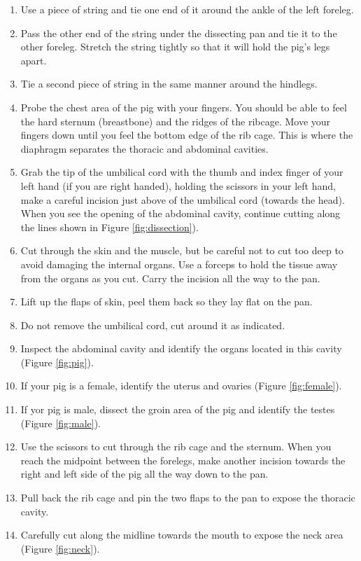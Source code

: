 \begin{enumerate}
\item
  Use a piece of string and tie one end of it around the ankle of the left foreleg.
\item
  Pass the other end of the string under the dissecting pan and tie it to the other foreleg. Stretch the string tightly so that it will hold the pig's legs apart.
\item
  Tie a second piece of string in the same manner around the hindlegs.
\item
  Probe the chest area of the pig with your fingers. You should be able to feel the hard sternum (breastbone) and the ridges of the ribcage. Move your fingers down until you feel the bottom edge of the rib cage. This is where the diaphragm separates the thoracic and abdominal cavities.
\item
        Grab the tip of the umbilical cord with the thumb and index finger of your left hand (if you are right handed), holding the scissors in your left hand, make a careful incision just above of the umbilical cord (towards the head). When you see the opening of the abdominal cavity, continue cutting along the lines shown in Figure \ref{fig:dissection}).
\item
  Cut through the skin and the muscle, but be careful not to cut too deep to avoid damaging the internal organs. Use a forceps to hold the tissue away from the organs as you cut. Carry the incision all the way to the pan.
\item
  Lift up the flaps of skin, peel them back so they lay flat on the pan.
\item
  Do not remove the umbilical cord, cut around it as indicated.
\item
  Inspect the abdominal cavity and identify the organs located in this cavity (Figure \ref{fig:pig}).
\item
  If your pig is a female, identify the uterus and ovaries (Figure \ref{fig:female}).
\item
  If yor pig is male, dissect the groin area of the pig and identify the testes (Figure \ref{fig:male}).
\item
  Use the scissors to cut through the rib cage and the sternum. When you reach the midpoint between the forelegs, make another incision towards the right and left side of the pig all the way down to the pan.
\item
  Pull back the rib cage and pin the two flaps to the pan to expose the thoracic cavity.
\item
  Carefully cut along the midline towards the mouth to expose the neck area (Figure \ref{fig:neck}).

\end{enumerate}

